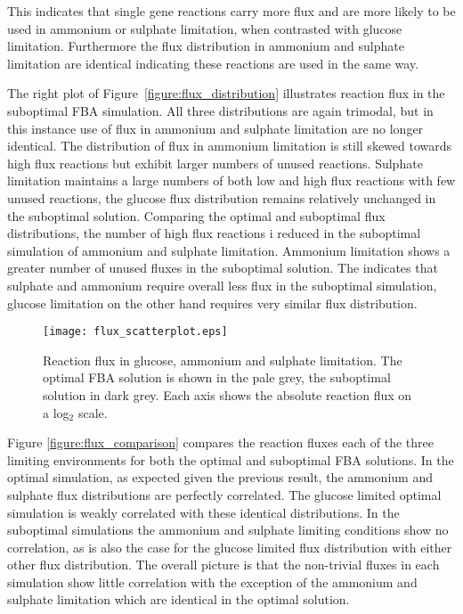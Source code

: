 This indicates that single gene reactions carry more flux and are more likely to be used in ammonium or sulphate limitation, when contrasted with glucose limitation. Furthermore the flux distribution in ammonium and sulphate limitation are identical indicating these reactions are used in the same way.

The right plot of Figure~\ref{figure:flux_distribution} illustrates reaction flux in the suboptimal FBA simulation. All three distributions are again trimodal, but in this instance use of flux in ammonium and sulphate limitation are no longer identical. The distribution of flux in ammonium limitation is still skewed towards high flux reactions but exhibit larger numbers of unused reactions. Sulphate limitation maintains a large numbers of both low and high flux reactions with few unused reactions, the glucose flux distribution remains relatively unchanged in the suboptimal solution. Comparing the optimal and suboptimal flux distributions, the number of high flux reactions i reduced in the suboptimal simulation of ammonium and sulphate limitation. Ammonium limitation shows a greater number of unused fluxes in the suboptimal solution. The indicates that sulphate and ammonium require overall less flux in the suboptimal simulation, glucose limitation on the other hand requires very similar flux distribution.


\begin{figure}%
  \centering
  \texttt{[image: flux\_scatterplot.eps]}
  \caption[Reaction flux in glucose, ammonium and sulphate limitation]{Reaction flux in glucose, ammonium and sulphate limitation. The optimal FBA solution is shown in the pale grey, the suboptimal solution in dark grey. Each axis shows the absolute reaction flux on a log$_2$ scale. }
  \label{figure:flux_comparison}
\end{figure}%

Figure \vref{figure:flux_comparison} compares the reaction fluxes each of the three limiting environments for both the optimal and suboptimal FBA solutions. In the optimal simulation, as expected given the previous result, the ammonium and sulphate flux distributions are perfectly correlated. The glucose limited optimal simulation is weakly correlated with these identical distributions. In the suboptimal simulations the ammonium and sulphate limiting conditions show no correlation, as is also the case for the glucose limited flux distribution with either other flux distribution. The overall picture is that the non-trivial fluxes in each simulation show little correlation with the exception of the ammonium and sulphate limitation which are identical in the optimal solution.

